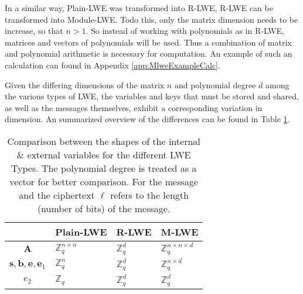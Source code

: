 In a similar way, Plain-LWE was transformed into R-LWE, R-LWE can be transformed into Module-LWE. Todo this, only the matrix dimension needs to be increase, so that $n>1$. So instead of working with polynomials as in R-LWE, matrices and vectors of polynomials will be used. Thus a combination of matrix and polynomial arithmetic is necessary for computation. An example of such an calculation can found in Appendix \ref{app:MlweExampleCalc}.

Given the differing dimensions of the matrix $n$ and polynomial degree $d$ among the various types of LWE, the variables and keys that must be stored and shared, as well as the messages themselves, exhibit a corresponding variation in dimension. An summarized overview of the differences can be found in Table \ref{table:LweDiffs}.


\begin{table}[htbp]
  \caption[LWE variables shape comparison]{Comparison between the shapes of the internal \& external variables for the different LWE Types. The polynomial degree is treated as a vector for better comparison. For the message and the ciphertext $\ell$ refers to the length (number of bits) of the message.}
  \label{table:LweDiffs}
  \centering
  \begin{tabular}{|c|l|l|l|}
    \toprule
                                                    & Plain-LWE                                        & R-LWE                                                                              & M-LWE                                                                                      \\
    \midrule
    $\textbf{A}$                                    & $\mathbb{Z}^{n\times n}_q$                       & $\mathbb{Z}^d_q$                                                                   & $\mathbb{Z}^{n\times n \times d}_q$                                                        \\
    $\textbf{s},\textbf{b},\textbf{e},\textbf{e}_1$ & $\mathbb{Z}^{n}_q$                               & $\mathbb{Z}^d_q$                                                                   & $\mathbb{Z}^{n\times d}_q$                                                                 \\
    $e_2$                                           & $\mathbb{Z}_q$                                   & $\mathbb{Z}^d_q$                                                                   & $\mathbb{Z}^d_q$                                                                           \\

\end{tabular}
\end{table}
